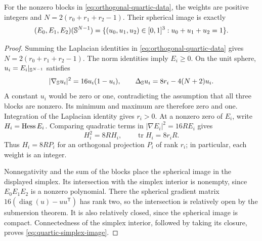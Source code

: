 \begin{lemma}
\label{lem:quartic-block-weights-image}
For the nonzero blocks in \eqref{eq:orthogonal-quartic-data}, the
weights are positive integers and $N=2(r_0+r_1+r_2-1)$. Their
spherical image is exactly
\begin{equation}\label{eq:quartic-simplex-image}
 (E_0,E_1,E_2)(\mathbb S^{N-1})
 =\{(u_0,u_1,u_2)\in[0,1]^3:u_0+u_1+u_2=1\}.
\end{equation}
\end{lemma}

\begin{proof}
Summing the Laplacian identities in \eqref{eq:orthogonal-quartic-data}
gives $N=2(r_0+r_1+r_2-1)$. The norm identities imply $E_i\geq0$.
On the unit sphere,
$u_i=E_i|_{\mathbb S^{N-1}}$ satisfies
\[
 |\nabla_{\mathbb S}u_i|^2=16u_i(1-u_i),\qquad
 \Delta_{\mathbb S}u_i=8r_i-4(N+2)u_i.
\]
A constant $u_i$ would be zero or one, contradicting the assumption
that all three blocks are nonzero.  Its minimum and maximum are
therefore zero and one.  Integration of the Laplacian identity
gives $r_i>0$.  At a nonzero zero of $E_i$, write
$H_i=\operatorname{Hess} E_i$.  Comparing quadratic terms in
$|\nabla E_i|^2=16RE_i$ gives
\[
 H_i^2=8RH_i,\qquad \operatorname{tr}H_i=8r_iR.
\]
Thus $H_i=8RP_i$ for an orthogonal projection $P_i$ of rank $r_i$;
in particular, each weight is an integer.

Nonnegativity and the sum of the blocks place the spherical image
in the displayed simplex. Its intersection with the simplex interior
is nonempty, since $E_0E_1E_2$ is a nonzero polynomial. There the
spherical gradient matrix
$16(\operatorname{diag}(u)-uu^{\mathsf T})$ has rank two, so the
intersection is relatively open by the submersion theorem. It is
also relatively closed, since the spherical image is compact.
Connectedness of the simplex interior, followed by taking its closure,
proves \eqref{eq:quartic-simplex-image}.
\end{proof}


